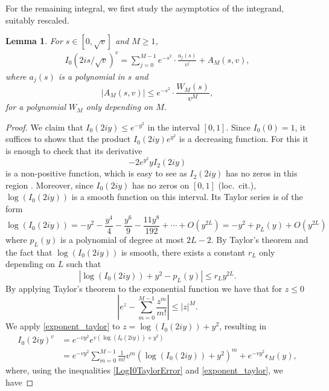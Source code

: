 \documentclass[12pt,reqno]{amsart}
\theoremstyle{definition}
\theoremstyle{plain}
\newtheorem{lemma}[theorem]{Lemma}
\theoremstyle{definition}
\renewcommand{\geq}{\geqslant}
\renewcommand{\leq}{\leqslant}
\begin{document}
For the remaining integral, we first study the asymptotics of the integrand, suitably rescaled. 
\begin{lemma}
	\label{LemI0exp}
	For $s \in [0, \sqrt{v}]$ and $M \geq 1$, 
	\begin{align*}
		I_0(2 i s/\sqrt{v})^{v} =\sum_{j = 0}^{M-1} e^{-s^2} \cdot \frac{a_j(s)}{v^j} + A_M(s,v),
	\end{align*}
	where $a_j(s)$ is a polynomial in $s$ and 
	\[ |A_M(s,v)| \leq e^{-s^2} \cdot\frac{W_M(s)}{v^{M}},\]
	for a polynomial $W_M$ only depending on $M$.
\end{lemma}
\begin{proof}
	We claim that $I_0(2 i y) \leq e^{-y^2}$ in the interval $[0, 1]$. Since $I_0(0) = 1$, it suffices to shows that the product $I_0(2 i y)  e^{y^2}$ is a decreasing function. For this it is enough to check that its derivative $$-2 e^{y^2} y I_2(2 i y)$$ is a non-positive function, which is easy to see as  $I_2(2 i y)$ has no zeros in this region \cite[p. 409]{Abramowitz}.
	Moreover, since $I_0(2 i y)$ has no zeros on $[0,1]$ (loc.\ cit.), $\log(I_0(2 i y))$ is a smooth function on this interval. Its Taylor series is of the form 
	\begin{equation}
		\label{LogI0Taylor}
		\log(I_0(2 i y)) = -y^2 - \frac{y^4}{4} -\frac{y^6}{9}-\frac{11 y^8}{192} + \cdots + O(y^{2L}) = -y^2 + p_{L}(y) + O(y^{2L})    
	\end{equation}
	where $p_L(y)$ is a polynomial of degree at most $2L-2$. 
	By Taylor's theorem and the fact that $\log(I_0(2 i y))$ is smooth, there exists a constant $r_L$ only depending on $L$ such that
	\begin{equation}
		\label{LogI0TaylorError}
		\left| \log(I_0(2 i y)) + y^2 -p_L(y) \right| \leq r_L y^{2L}.
	\end{equation}
	By applying Taylor's theorem to the exponential function we have that for $z \leq 0$
	\begin{equation}
		\label{exponent_taylor}
		\left|e^{z} - \sum_{m = 0}^{M-1} \frac{z^m}{m!} \right| \leq |z|^{M}.    
	\end{equation}
	We apply \eqref{exponent_taylor} to $z = \log(I_0(2 i y)) + y^2$, resulting in	
	\begin{align}
		I_0(2 i y)^v &= e^{-v y^2} e^{v(\log(I_0(2 i y)) + y^2)}\\
		&=e^{-vy^2}\sum_{m = 0}^{M-1}\frac{1}{m!} v^m (\log(I_0(2 i y)) + y^2)^m + e^{-v y^2}\epsilon_{M}(y), 
	\end{align}
	where, using the inequalities \eqref{LogI0TaylorError} and \eqref{exponent_taylor}, we have 

\end{proof}
\end{document}
